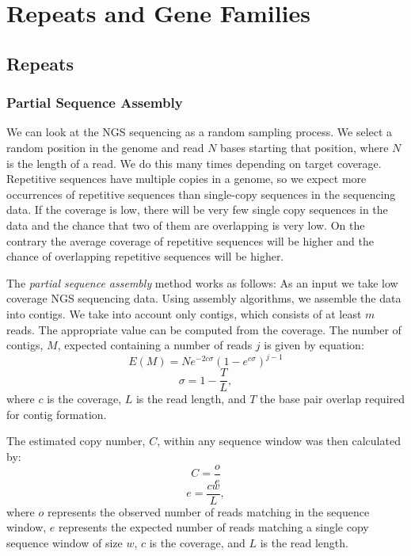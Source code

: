 \chapter{Repeats and Gene Families}\label{chap:repeatsfamilies}


\section{Repeats}


\subsection{Partial Sequence Assembly}

We can look at the NGS sequencing as a random sampling process. We select a random position in the genome and read $N$ bases starting that position, where $N$ is the length of a read. We do this many times depending on target coverage.
Repetitive sequences have multiple copies in a genome, so we expect more occurrences of repetitive sequences than single-copy sequences in the sequencing data. If the coverage is low, there will be very few single copy sequences in the data and the chance that two of them are overlapping is very low. On the contrary the average coverage of repetitive sequences will be higher and the chance of overlapping repetitive sequences will be higher.

The \emph{partial sequence assembly} method works as follows: As an input we take low coverage NGS sequencing data. Using assembly algorithms, we assemble the data into contigs. We take into account only contigs, which consists of at least $m$ reads. The appropriate value can be computed from the coverage. The number of contigs, $M$, expected containing a number of reads $j$ is given by equation\cite{swaminathan2007global}:
$$E(M) = Ne^{-2c\sigma}(1-e^{c\sigma})^{j-1}$$
$$\sigma = 1 - \frac{T}{L},$$
where $c$ is the coverage, $L$ is the read length, and $T$ the base pair overlap required for contig formation.

The estimated copy number, $C$, within any sequence window was then calculated by\cite{swaminathan2007global}:
$$C = \frac{o}{e}$$
$$e = \frac{cw}{L},$$
where $o$ represents the observed number of reads matching in the sequence window, $e$ represents the expected number of reads matching a single copy sequence window of size $w$, $c$ is the coverage, and $L$ is the read length.

